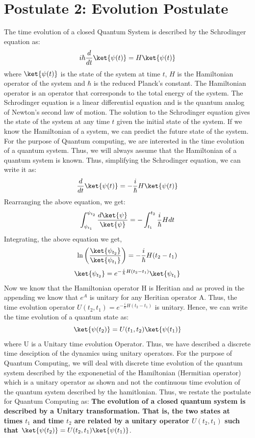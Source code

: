 \documentclass[12pt, oneside]{book}
\theoremstyle{definition}
\theoremstyle{definition}
\theoremstyle{remark}
\begin{document}
\section{Postulate 2: Evolution Postulate}\label{subsection:Postulate 2}
The time evolution of a closed Quantum System is described by the Schrodinger equation as:
\[
    i\hbar\frac{d}{dt}\ket{\psi(t)}=H\ket{\psi(t)}
\]
where $\ket{\psi(t)}$ is the state of the system at time $t$, $H$ is the Hamiltonian operator of the system and $\hbar$ is the reduced Planck's constant.
The Hamiltonian operator is an operator that corresponds to the total energy of the system. The Schrodinger equation is a linear differential equation and is the quantum analog of Newton's second law of motion.
The solution to the Schrodinger equation gives the state of the system at any time $t$ given the initial state of the system.
If we know the Hamiltonian of a system, we can predict the future state of the system. For the purpose of Quantum computing, we are interested in the time evolution of a quantum system. Thus, we will
always assume that the Hamiltonian of a quantum system is known. Thus, simplifying the Schrodinger equation, we can write it as:
\[
    \frac{d}{dt}\ket{\psi(t)}=-\frac{i}{\hbar}H\ket{\psi(t)}
\]
Rearranging the above equation, we get:
\[
    \int_{\psi_{t_1}}^{\psi_{t_2}} \frac{d\ket{\psi}}{\ket{\psi}}=-\int_{t_1}^{t_2}\frac{i}{\hbar}Hdt
\]
Integrating, the above equation we get,
\[
    \ln\left(\frac{\ket{\psi_{t_2}}}{\ket{\psi_{t_1}}}\right)=-\frac{i}{\hbar}H(t_2-t_1)
\]
\[\ket{\psi_{t_2}}=e^{-\frac{i}{\hbar}H(t_2-t_1)}\ket{\psi_{t_1}}\]
Now we know that the Hamiltonian operator H is Heritian and as proved in the appending we know that $e^{A}$ is unitary for any Heritian operator A.
Thus, the time evolution operator $U(t_2,t_1)=e^{-\frac{i}{\hbar}H(t_2-t_1)}$ is unitary.
Hence, we can write the time evolution of a quantum state as:
\[
    \ket{\psi(t_2)}=U(t_1,t_2)\ket{\psi(t_1)}
\]
where U is a Unitary time evolution Operator. Thus, we have described a discrete time desciption of the dynamics using unitary operators.
For the purpose of Quantum Computing, we will deal with discrete time evolution of the quantum system described by the exponenetial of the Hamiltonian (Hermitian operator) 
which is a unitary operator as shown and not the continuous time evolution of the quantum system described by the hamitlonian. Thus, we restate the postulate for Quantum Computing as:
\textbf{The evolution of a closed quantum system is described by a Unitary transformation. That is, the two states at times $t_1$ and time $t_2$ are related by
a unitary operator $U(t_2,t_1)$ such that $\ket{\psi(t_2)}=U(t_2,t_1)\ket{\psi(t_1)}$}.
\end{document}

